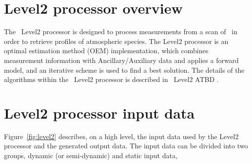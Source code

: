 \section{Level2 processor overview}

The \smr\ Level2 processor is designed to process
measurements from a scan of \smr\ in order to
retrieve profiles of atmospheric species.    
The Level2 processor is an optimal estimation method (OEM)
implementation, which combines measurement
information with Ancillary/Auxiliary data
and applies a forward model, and an iterative
scheme is used to find a best solution.   
The details of the algorithms within the
\smr\ Level2 processor is described in \smr\ Level2 ATBD
\citep{atbdl2}.

\section{Level2 processor input data}

Figure~\ref{fig:level2} describes, on a high level, the input data used
by the Level2 processor and the generated output data.
The input data can be divided into two groups,
dynamic (or semi-dynamic) and static input data,

